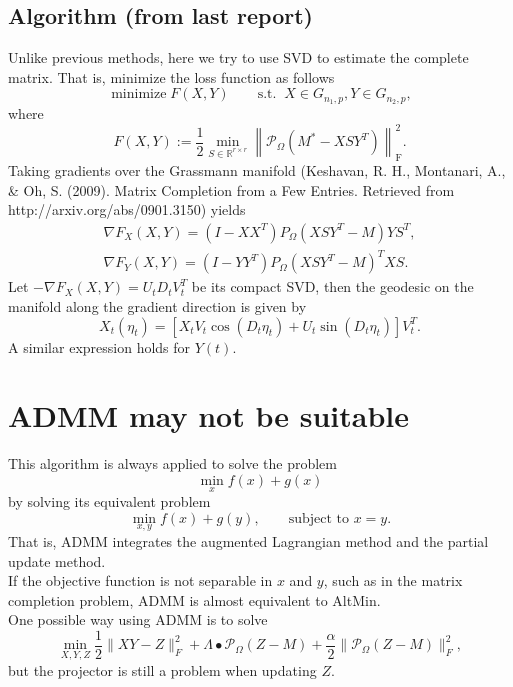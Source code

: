 \documentclass[12pt]{article}%
\begin{document}
\subsection{Algorithm (from last report)}
Unlike previous methods, here we try to use SVD to estimate the complete matrix. That is, minimize the loss function as follows
$$
\operatorname{minimize} F(X, Y)\qquad \text{s.t. }\ X \in G_{n_1, p}, Y \in G_{n_2, p},
$$
where
$$
F(X,Y) :=\frac{1}{2}\min _{{S} \in \mathbb{R}^{r \times r}}\left\|\mathcal{P}_{\Omega}\left({M}^*-{XS} {Y}^{T}\right)\right\|_{\mathrm{F}}^{2}.
$$
Taking gradients over the Grassmann manifold (Keshavan, R. H., Montanari, A., \& Oh, S. (2009). Matrix Completion from a Few Entries. Retrieved from http://arxiv.org/abs/0901.3150) yields
$$
\begin{array}{l}
{\nabla F_{X}(X, Y)=\left(I-X X^{T}\right) P_{\Omega}\left(X S Y^{T}-M\right) Y S^{T}}, \\ {\nabla F_{Y}(X, Y)=\left(I-YY^{T}\right) P_{\Omega}\left(X S Y^{T}-M\right)^{T} X S}.
\end{array}
$$
Let $-\nabla F_{X}(X, Y) = U_tD_tV_t^T$ be its compact SVD, then the geodesic on the manifold along the gradient direction is given by
$$
X_{t}(\eta_t)=\left[{X}_{t} {{V}}_{t} \cos \left({{D}}_{t} \eta_t\right)+{{U}}_{t} \sin \left({{D}}_{t} \eta_t\right)\right] {{V}}_{t}^{T}.
$$
A similar expression holds for $Y(t)$.

\section{ADMM may not be suitable}
This algorithm is always applied to solve the problem
$$
\min_x f(x) +g(x)
$$
by solving its equivalent problem
$$
\min_{x, y}f(x)+g(y), \qquad \text{subject to } x=y.
$$
That is, ADMM integrates the augmented Lagrangian method and the partial update method.\\
If the objective function is not separable in $x$ and $y$, such as in the matrix completion problem, ADMM is almost equivalent to AltMin.\\
One possible way using ADMM is to solve
$$
\min_{X, Y, Z} \frac{1}{2}\|XY-Z\|_F^2+\Lambda \bullet \mathcal{P}_\Omega(Z-M)+\frac{\alpha}{2}\|\mathcal{P}_\Omega(Z-M)\|_F^2,
$$
but the projector is still a problem when updating $Z$.
\end{document}

